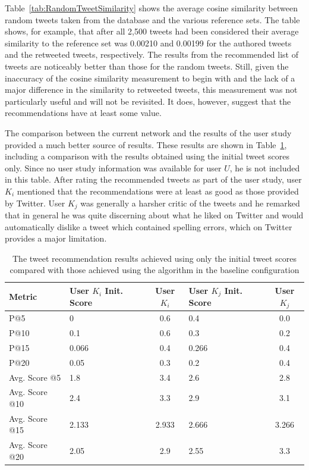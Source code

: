 Table~\ref{tab:RandomTweetSimilarity} shows the average cosine similarity between random tweets taken from the database and the various reference sets. The table shows, for example, that after all 2,500 tweets had been considered their average similarity to the reference set was 0.00210 and 0.00199 for the authored tweets and the retweeted tweets, respectively. The results from the recommended list of tweets are noticeably better than those for the random tweets. Still, given the inaccuracy of the cosine similarity measurement to begin with and the lack of a major difference in the similarity to retweeted tweets, this measurement was not particularly useful and will not be revisited. It does, however, suggest that the recommendations have at least some value.

The comparison between the current network and the results of the user study provided a much better source of results. These results are shown in Table~\ref{tab:BaseTweetResults}, including a comparison with the results obtained using the initial tweet scores only. Since no user study information was available for user $U$, he is not included in this table. After rating the recommended tweets as part of the user study, user $K_{i}$ mentioned that the recommendations were at least as good as those provided by Twitter. User $K_{j}$ was generally a harsher critic of the tweets and he remarked that in general he was quite discerning about what he liked on Twitter and would automatically dislike a tweet which contained spelling errors, which on Twitter provides a major limitation.


\begin{table}
\centering
\begin{tabular}{l|p{2.25cm}|c|p{2.25cm}|c}
{\bf Metric}& {\bf User $K_{i}$ Init. Score} & {\bf User $K_{i}$} & {\bf User $K_{j}$ Init. Score} & {\bf User $K_{j}$} \\ \hline
P@5   & 0 & 0.6 & 0.4 & 0.0 \\ \hline
P@10 & 0.1 & 0.6 & 0.3 & 0.2 \\ \hline
P@15 & 0.066 & 0.4 & 0.266 & 0.4 \\ \hline
P@20 & 0.05 & 0.3 & 0.2 & 0.4 \\ \hline
Avg. Score @5   & 1.8 & 3.4 & 2.6 & 2.8 \\ \hline
Avg. Score @10 & 2.4 & 3.3 & 2.9 & 3.1 \\ \hline
Avg. Score @15 & 2.133 & 2.933 & 2.666 & 3.266 \\ \hline
Avg. Score @20 & 2.05 & 2.9 & 2.55 & 3.3 \\
\end{tabular}
\caption[Tweet recommendation results for the baseline configuration]{The tweet recommendation results achieved using only the initial tweet scores compared with those achieved using the algorithm in the baseline configuration}
\label{tab:BaseTweetResults}
\end{table}


